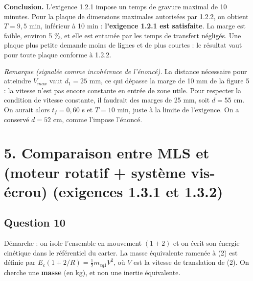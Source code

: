 \documentclass[11pt,a4paper]{article}
\newcommand{\equationajustee}[1]{%
  \sbox{\boiteequation}{$\displaystyle #1$}%
  \ifdim\wd\boiteequation>\linewidth
    \[\resizebox{\linewidth}{!}{\usebox{\boiteequation}}\]%
  \else
    \[#1\]%
  \fi}
\begin{document}
\equationajustee{\begin{aligned}
T &= 2\times500\times0{,}57\ \text{s}\\
&= 570\ \text{s}\\
&= 9{,}5\ \text{min}
\end{aligned}}

\equationajustee{\boxed{T = 9{,}5\ \text{min}}}

\textbf{Conclusion.} L'exigence 1.2.1 impose un temps de gravure maximal de 10 minutes. Pour la plaque de dimensions maximales autorisées par 1.2.2, on obtient \(T = 9{,}5\) min, inférieur à 10 min : \textbf{l'exigence 1.2.1 est satisfaite}. La marge est faible, environ 5 \%, et elle est entamée par les temps de transfert négligés. Une plaque plus petite demande moins de lignes et de plus courtes : le résultat vaut pour toute plaque conforme à 1.2.2.

\emph{Remarque (signalée comme incohérence de l'énoncé).} La distance nécessaire pour atteindre \(V_{max}\) vaut \(d_1 = 25\) mm, ce qui dépasse la marge de 10 mm de la figure 5 : la vitesse n'est pas encore constante en entrée de zone utile. Pour respecter la condition de vitesse constante, il faudrait des marges de 25 mm, soit \(d = 55\) cm. On aurait alors \(t_f = 0{,}60\) s et \(T = 10\) min, juste à la limite de l'exigence. On a conservé \(d = 52\) cm, comme l'impose l'énoncé.

\hypertarget{comparaison-entre-mls-et-moteur-rotatif-systuxe8me-vis-uxe9crou-exigences-1.3.1-et-1.3.2}{%
\section{5. Comparaison entre MLS et (moteur rotatif + système vis-écrou) (exigences 1.3.1 et 1.3.2)}\label{comparaison-entre-mls-et-moteur-rotatif-systuxe8me-vis-uxe9crou-exigences-1.3.1-et-1.3.2}}

\hypertarget{question-10}{%
\subsection{Question 10}\label{question-10}}

Démarche : on isole l'ensemble en mouvement \((1+2)\) et on écrit son énergie cinétique dans le référentiel du carter. La masse équivalente ramenée à (2) est définie par \(E_c(1+2/R) = \tfrac12 m_{eq1} V^2\), où \(V\) est la vitesse de translation de (2). On cherche une \textbf{masse} (en kg), et non une inertie équivalente.
\end{document}
